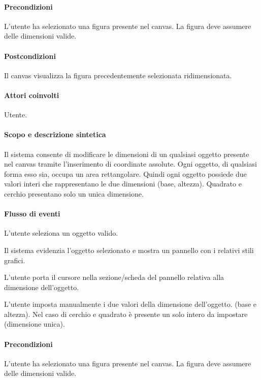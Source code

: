 \paragraph{Precondizioni} L'utente ha selezionato una figura presente nel canvas. La figura deve assumere delle dimensioni valide.
\paragraph{Postcondizioni} Il canvas visualizza la figura precedentemente selezionata ridimensionata.


\paragraph{Attori coinvolti} Utente.
\paragraph{Scopo e descrizione sintetica} Il sistema consente di modificare le dimensioni  di un qualsiasi oggetto presente nel canvas tramite l'inserimento di coordinate assolute.  Ogni oggetto, di qualsiasi forma esso sia, occupa un area rettangolare. Quindi ogni oggetto possiede due valori interi che rappresentano le due dimensioni (base, altezza). Quadrato e cerchio presentano solo un unica dimensione.
\paragraph{Flusso di eventi}
\begin{elenconumerato}[\textbf{}]{\subsubsecindent}
\item  L'utente seleziona un oggetto valido.
\item  Il sistema evidenzia l'oggetto selezionato e mostra un pannello con i relativi stili grafici.
\item  L'utente porta il cursore nella sezione/scheda del pannello relativa alla dimensione dell'oggetto.
\item  L'utente imposta manualmente i due valori della dimensione dell'oggetto.
(base e altezza). Nel caso di cerchio e quadrato  \`e  presente un solo intero da impostare (dimensione unica).
\end{elenconumerato}
\paragraph{Precondizioni} L'utente ha selezionato una figura presente nel canvas. La figura deve assumere delle dimensioni valide.
